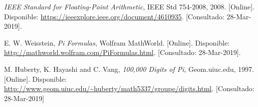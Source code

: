 \documentclass{article}
\begin{document}
    \begin{thebibliography}{1}
        \textit{IEEE Standard for Floating-Point Arithmetic},
        IEEE Std 754-2008, 2008. [Online]. Disponible: 
        \url{https://ieeexplore.ieee.org/document/4610935}.
        [Consultado: 28-Mar-2019].
        
        E. W. Weisstein, \textit{Pi Formulas}, Wolfram MathWorld. [Online]. 
        Disponible: \url{http://mathworld.wolfram.com/PiFormulas.html}.
        [Consultado: 28-Mar-2019].

        M. Huberty, K. Hayashi and C. Vang, \textit{100,000 Digits of Pi}, 
        Geom.uiuc.edu, 1997. [Online]. Disponible: 
        \url{http://www.geom.uiuc.edu/~huberty/math5337/groupe/digits.html}. 
        [Consultado: 28-Mar-2019]
    \end{thebibliography}
\end{document}
